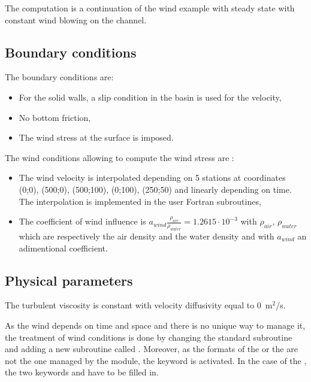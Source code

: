 The computation is a continuation of the wind example with steady state with constant wind
blowing on the channel.

\subsection{Boundary conditions}

The boundary conditions are:
\begin{itemize}
\item For the solid walls, a slip condition in the basin is used for the velocity,
\item No bottom friction,
\item The wind stress at the surface is imposed.
\end{itemize}
The wind conditions allowing to compute the wind stress are :
\begin{itemize}
\item The wind velocity is interpolated depending on 5 stations at coordinates (0;0), (500;0), (500;100), (0;100), (250;50) and linearly depending on time. The interpolation is implemented in the user Fortran subroutines,
\item The coefficient of wind influence is
 $a_{wind} \frac{\rho_{air}}{\rho_{water}} = 1.2615 \cdot 10^{-3}$ 
 with $\rho_{air}$, $\rho_{water}$ which are respectively the air density 
 and the water density and with $a_{wind}$ an adimentional coefficient.
\end{itemize}

\subsection{Physical parameters}

The turbulent viscosity is constant with velocity 
diffusivity equal to 0~m$^2$/s.

As the wind depends on time and space and there is no unique way to manage it,
the treatment of wind conditions is done by changing the standard 
subroutine and adding a new subroutine called .
Moreover, as the formats of the  or the
 are not the one managed by the
 module, the keyword
 is activated.
In the case of the , the two keywords
 and  have to be
filled in.

